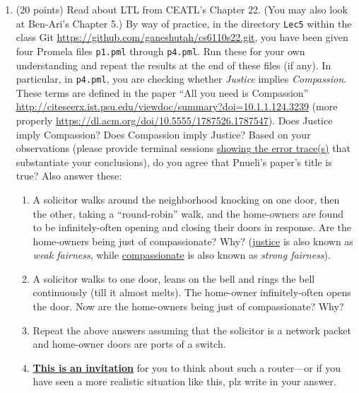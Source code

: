 \documentclass[11pt]{article}
\begin{document}
\begin{enumerate}
  
\item (20 points) Read about LTL from 
  CEATL's Chapter 22.
  (You may also look at Ben-Ari's Chapter 5.)
  By way of practice,
  in the directory {\tt Lec5}
  within the class Git
  \url{https://github.com/ganeshutah/cs6110s22.git},
  you have been given four Promela files {\tt p1.pml}
  through {\tt p4.pml}.   
  Run these for your own understanding and repeat the results
  at the end of these files (if any).
  In particular, in {\tt p4.pml}, you are checking
  whether {\em Justice} implies {\em Compassion}.
  These terms are defined in the paper
  ``All you need is Compassion''
  \url{http://citeseerx.ist.psu.edu/viewdoc/summary?doi=10.1.1.124.3239}
  (more properly \url{https://dl.acm.org/doi/10.5555/1787526.1787547}).
  Does Justice imply Compassion?
  Does Compassion imply Justice?
  Based on your observations (please provide terminal sessions \underline{showing
  the error trace(s)} that substantiate your conclusions),
  do you agree that Pnueli's paper's title is true?
  Also answer these:
  \begin{enumerate}
  \item A solicitor walks around the neighborhood knocking on one door,
    then the other, taking a ``round-robin'' walk, and the home-owners
    are found to be infinitely-often opening and closing their doors
    in response.
    Are the home-owners being just of compassionate? Why?
    (\underline{justice} is also known as {\em weak fairness}, while
    \underline{compassionate} is also known as {\em strong fairness}).

  \item A solicitor walks to one door, leans on the bell and rings
    the bell continuously (till it almost melts).
    The home-owner infinitely-often opens the door.
    Now are the home-owners being just of compassionate?     Why?

  \item Repeat the above answers assuming that the solicitor is
    a network packet and home-owner doors are ports of a switch.
  \item[] \underline{\bf This is an invitation} for you to think
    about such a router---or if you have seen a more realistic situation
    like this, plz write in your answer.
  \end{enumerate}



\end{enumerate}
\end{document}
